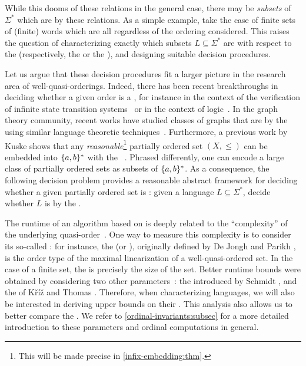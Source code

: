 \AP While this dooms  of these
relations in the general case, there may be \emph{subsets} of $\Sigma^*$ which
are  by these relations. As a simple example, take the
case of finite sets of (finite) words which are all 
regardless of the ordering considered. This raises the question of
characterizing exactly which subsets $L \subseteq \Sigma^*$ are
 with respect to the  (respectively,
the  or the ), and designing
suitable decision procedures.

\AP Let us argue that these decision procedures fit a larger picture in the
research area of well-quasi-orderings.
Indeed, there has been recent breakthroughs in deciding whether a given order
is a , for instance in the context of the verification of
infinite state transition systems~\cite{DBLP:conf/fsttcs/FinkelG19} or in the
context of logic~\cite{DBLP:journals/pacmpl/BergstrasserGLZ24}.
In the graph theory community, recent works have studied classes of graphs 
that are  by the 
using similar language theoretic techniques~\cite{DRT10,L24:arxiv:v2,ALM17}.
Furthermore, a previous work by Kuske shows that any
\emph{reasonable}\footnote{ This will be made precise in
\cref{infix-embedding:thm}. } partially ordered set $(X, \leq)$ can
be embedded into $\{ a,b \}^*$ with the ~\cite[Lemma
5.1]{DBLP:journals/ita/Kuske06}. Phrased differently, one can encode a large
class of partially ordered sets as subsets of $\{ a,b \}^*$. As a consequence,
the following decision problem provides a reasonable abstract framework for
deciding whether a given partially ordered set is :
given a language $L \subseteq \Sigma^*$, decide whether $L$ is
 by the .

\AP The runtime of an algorithm based on  is deeply
related to the ``complexity'' of the underlying quasi-order~\cite{SCHMITZ17}.
One way to measure this complexity is to consider its so-called : for instance, the  (or ),
originally defined by De Jongh and Parikh \cite{dejongh77}, is the order type
of the maximal linearization of a well-quasi-ordered set. In the case of a
finite set, the  is precisely the size of the set. Better runtime
bounds were obtained by considering two other parameters~\cite{SCHMITZ19}: the
 introduced by Schmidt \cite{schmidt81}, and the  of Kříž and Thomas \cite{kriz90b}. Therefore, when characterizing
 languages, we will also be interested in deriving upper
bounds on their . This analysis also allows us to better
compare the . We refer to
\cref{ordinal-invariants:subsec} for a more detailed introduction to these
parameters and ordinal computations in general.

